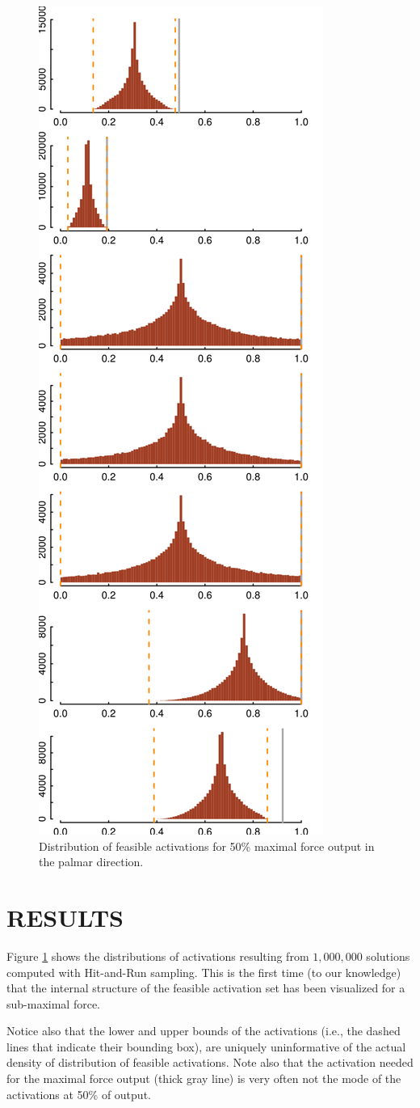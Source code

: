\begin{figure}[htbp]
\centering
\includegraphics[width=7.5cmh]{sections/figs/raw_histograms.png}
\caption{Distribution of feasible activations for 50\% maximal force output in the palmar direction.}
\label{fig:raw_histograms}
\end{figure}


\section{RESULTS}

Figure \ref{fig:raw_histograms} shows the distributions of activations resulting from $1,000,000$ solutions computed with Hit-and-Run sampling. This is the first time (to our knowledge) that the internal structure of the feasible activation set has been visualized for a sub-maximal force.

Notice also that the lower and upper bounds of the activations (i.e., the dashed lines that indicate their bounding box), are uniquely uninformative of the actual density of distribution of feasible activations. Note also that the activation needed for the maximal force output (thick gray line) is very often not the mode of the activations at 50\% of output.

